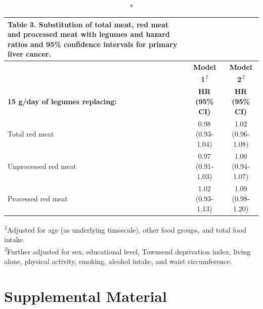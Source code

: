 \documentclass[sn-basic,Numbered,pdflatex]{sn-jnl}
\begin{document}
\newpage

\begingroup
\setlength{}
\setlength{}\setlength{\LTpost}{0mm}
\begin{longtable}{@{\extracolsep{\fill}}lcc}
\caption*{
{\large \textbf{Table 3. Substitution of total meat, red meat and processed meat with legumes and hazard ratios and 95\% confidence intervals for primary liver cancer.}}
} \\ 
\toprule
 & {\bfseries \textbf{Model 1}}\textsuperscript{\textit{1}} & {\bfseries \textbf{Model 2}}\textsuperscript{\textit{2}} \\ 
\cmidrule(lr){2-2} \cmidrule(lr){3-3}
\textbf{15 g/day of legumes replacing:} & \textbf{HR} \textbf{(95\% CI)} & \textbf{HR} \textbf{(95\% CI)} \\ 
\midrule\addlinespace[2.5pt]
Total red meat & 0.98 (0.93-1.04) & 1.02 (0.96-1.08) \\ 
Unprocessed red meat & 0.97 (0.91-1.03) & 1.00 (0.94-1.07) \\ 
Processed red meat & 1.02 (0.93-1.13) & 1.09 (0.98-1.20) \\ 
\bottomrule
\end{longtable}
\begin{minipage}{\linewidth}
\textsuperscript{\textit{1}}Adjusted for age (as underlying timescale), other food groups, and total food intake.\\
\textsuperscript{\textit{2}}Further adjusted for sex, educational level, Townsend deprivation index, living alone, physical activity, smoking, alcohol intake, and waist circumference.\\
\end{minipage}
\endgroup

\newpage

\hypertarget{sec8}{%
\section{Supplemental Material}\label{sec8}}
\end{document}
